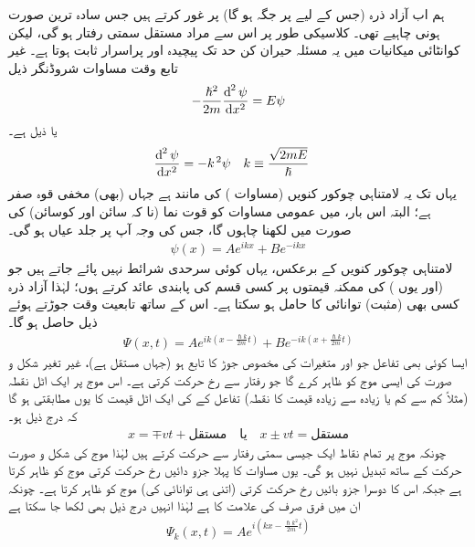 ہم اب آزاد ذرہ (جس کے لیے پر جگہ  ہو گا) پر غور کرتے ہیں جس سادہ ترین صورت ہونی چاہیے تھی۔ کلاسیکی طور پر اس سے مراد مستقل سمتی رفتار ہو گی، لیکن کوانٹائی میکانیات میں یہ مسئلہ حیران کن حد تک پیچیدہ اور پراسرار ثابت ہوتا ہے۔ غیر تابع وقت مساوات شروڈنگر ذیل 
\begin{align}\label{مساوات_شروڈنگر_آزاد_ذرہ_الف}
-\frac{\hslash^{2}}{2m}\frac{\dif^{\,2}{\psi}}{\dif{x^{2}}}=E\psi
\end{align}
یا ذیل ہے۔
\begin{align}
\frac{\dif^{\,2}{\psi}}{\dif{x^{2}}}&=-k^{\,2}\psi&& k\equiv\frac{\sqrt{2mE}}{\hslash}
\end{align}
یہاں تک یہ لامتناہی چوکور کنویں  (مساوات ) کی مانند ہے جہاں (بھی) مخفی قوہ صفر ہے؛ البتہ اس بار، میں عمومی مساوات کو قوت نما (نا کہ سائن اور کوسائن) کی صورت میں لكهنا چاہوں گا، جس کی وجہ آپ پر جلد عیاں ہو گی۔
\begin{align}
\psi(x)=Ae^{ikx}+Be^{-ikx}
\end{align}
لامتناہی چوکور کنویں  کے برعکس، یہاں کوئی سرحدی شرائط نہیں پائے جاتے ہیں جو  (اور یوں ) کی ممکنہ قیمتوں پر کسی قسم کی پابندی عائد کرتے ہوں؛ لہٰذا آزاد ذرہ کسی بھی (مثبت) توانائی کا حامل ہو سکتا ہے۔ اس کے ساتھ تابعیت وقت 
جوڑتے ہوئے ذیل حاصل ہو گا۔
\begin{align}\label{مساوات_شروڈنگر_آزاد_ذرہ_حرکت}
\Psi(x,t)=Ae^{ik(x-\frac{\hslash k}{2m}t)}+Be^{-ik(x+\frac{\hslash k}{2m}t)}
\end{align}
ایسا کوئی بھی تفاعل جو  اور  متغیرات کی مخصوص جوڑ  کا تابع ہو (جہاں  مستقل ہے)، 
 غیر تغیر شکل و صورت کی ایسی موج کو ظاہر کرے گا جو  رفتار سے  رخ حرکت کرتی ہے۔ اس موج پر ایک اٹل نقطہ (مثلاً کم سے کم یا زیادہ سے زیادہ قیمت کا نقطہ) تفاعل کے  کی ایک اٹل قیمت کا یوں مطابقتی ہو گا کہ درج ذیل ہو۔
\begin{align*}
x=\mp vt+\text{مستقل}\quad \text{یا}\quad x\pm vt=\text{مستقل}
\end{align*}
چونکہ موج پر تمام نقاط ایک جیسی سمتی رفتار سے حرکت کرتے ہیں لہٰذا موج کی شکل و صورت حرکت کے ساتھ تبدیل نہیں ہو گی۔ یوں مساوات  کا پہلا جزو دائیں رخ حرکت کرتی موج کو ظاہر کرتا ہے جبکہ اس کا دوسرا جزو بائیں رخ حرکت کرتی (اتنی ہی توانائی کی) موج کو ظاہر کرتا ہے۔ چونکہ ان میں فرق صرف  کی علامت کا ہے لہٰذا انہیں درج ذیل بھی لکھا جا سکتا ہے 
\begin{align}\label{مساوات_غیر_تابع_دائیں_رخ_چلتی}
\Psi_{k}(x,t)=Ae^{i(kx-\frac{\hslash k^{2}}{2m}t)}
\end{align}
